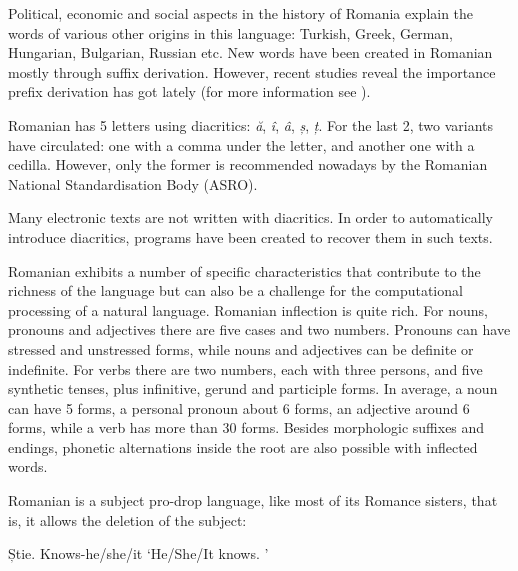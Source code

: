 \begin{multicols}{2}
Political, economic and social aspects in the history of Romania explain the words of various other origins in this language: Turkish, Greek, German, Hungarian, Bulgarian, Russian etc. New words have been created in Romanian mostly through suffix derivation. However, recent studies reveal the importance prefix derivation has got lately (for more information see \cite{brancus}).

Romanian has 5 letters using diacritics: \textit{ă}, \textit{î}, \textit{â}, \textit{ș}, \textit{ț}. For the last 2, two variants have circulated: one with a comma under the letter, and another one with a cedilla. However, only the former is recommended nowadays by the Romanian National Standardisation Body (ASRO).

Many electronic texts are not written with diacritics. In order to automatically introduce diacritics, programs have been created to recover them in such texts.


Romanian exhibits a number of specific characteristics that contribute to the richness of the language but can also be a challenge for the computational processing of a natural language. Romanian inflection is quite rich. For nouns, pronouns and adjectives there are five cases and two numbers. Pronouns can have stressed and unstressed forms, while nouns and adjectives can be definite or indefinite. For verbs there are two numbers, each with three persons, and five synthetic tenses, plus infinitive, gerund and participle forms. In average, a noun can have 5 forms, a personal pronoun about 6 forms, an adjective around 6 forms, while a verb has more than 30 forms. Besides morphologic suffixes and endings, phonetic alternations inside the root are also possible with inflected words.


Romanian is a subject pro-drop language, like most of its Romance sisters, that is, it allows the deletion of the subject:

\begin{example}
\gll Știe. 
Knows-he/she/it
\glt `He/She/It knows. '
\glend
\end{example}


\end{multicols}
